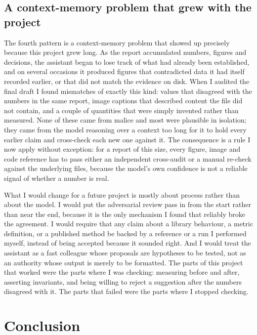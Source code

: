 \documentclass[11pt,a4paper]{article}
\begin{document}
\FloatBarrier
\FloatBarrier
\subsection{A context-memory problem that grew with the project}

The fourth pattern is a context-memory problem that showed up precisely because
this project grew long. As the report accumulated numbers, figures and
decisions, the assistant began to lose track of what had already been
established, and on several occasions it produced figures that contradicted data
it had itself recorded earlier, or that did not match the evidence on disk. When
I audited the final draft I found mismatches of exactly this kind: values that
disagreed with the numbers in the same report, image captions that described
content the file did not contain, and a couple of quantities that were simply
invented rather than measured. None of these came from malice and most were
plausible in isolation; they came from the model reasoning over a context too
long for it to hold every earlier claim and cross-check each new one against it.
The consequence is a rule I now apply without exception: for a report of this
size, every figure, image and code reference has to pass either an independent
cross-audit or a manual re-check against the underlying files, because the
model's own confidence is not a reliable signal of whether a number is real.

What I would change for a future project is mostly about process rather than
about the model. I would put the adversarial review pass in from the start
rather than near the end, because it is the only mechanism I found that
reliably broke the agreement. I would require that any claim about a library
behaviour, a metric definition, or a published method be backed by a reference
or a run I performed myself, instead of being accepted because it sounded right.
And I would treat the assistant as a fast colleague whose proposals are
hypotheses to be tested, not as an authority whose output is merely to be
formatted. The parts of this project that worked were the parts where I was
checking: measuring before and after, asserting invariants, and being willing to
reject a suggestion after the numbers disagreed with it. The parts that failed
were the parts where I stopped checking.

\FloatBarrier
\FloatBarrier
\section{Conclusion}
\label{sec:conclusion}
\end{document}
